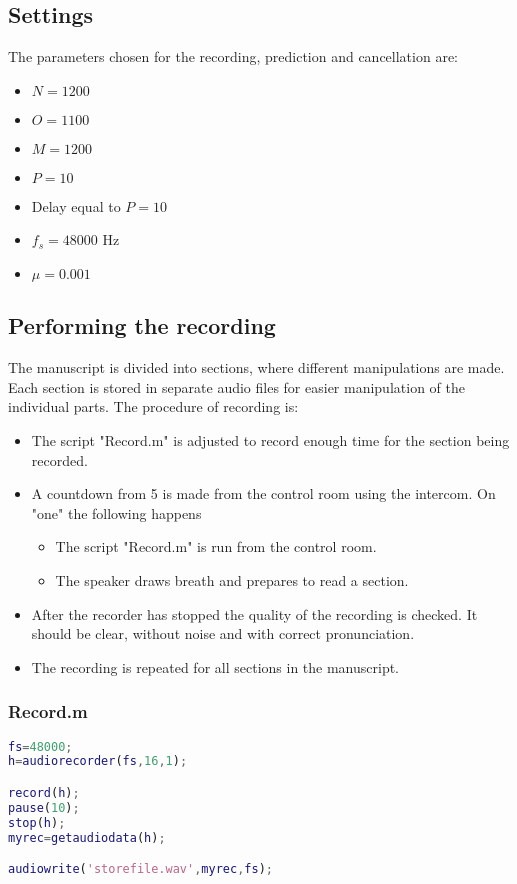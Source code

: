 \subsection{Settings}
The parameters chosen for the recording, prediction and cancellation are:
\begin{itemize}
	\item $N=1200$
	\item $O=1100$
	\item $M=1200$
	\item $P=10$
	\item Delay equal to $P=10$
	\item $f_s =48000$ Hz
	\item $\mu=0.001$
\end{itemize}

\subsection{Performing the recording}
The manuscript is divided into sections, where different manipulations are made. Each section is stored in separate audio files for easier manipulation of the individual parts. The procedure of recording is:
\begin{itemize}
	\item The script "Record.m" is adjusted to record enough time for the section being recorded. 
	\item A countdown from 5 is made from the control room using the intercom. On "one" the following happens
	\begin{itemize}
		\item The script "Record.m" is run from the control room.
		\item The speaker draws breath and prepares to read a section.
	\end{itemize}
	\item After the recorder has stopped the quality of the recording is checked. It should be clear, without noise and with correct pronunciation.
	\item The recording is repeated for all sections in the manuscript.  
\end{itemize}

\subsubsection{Record.m}
\begin{lstlisting}[language=MATLAB,caption=Record.m]
fs=48000;
h=audiorecorder(fs,16,1);

record(h);
pause(10);
stop(h);
myrec=getaudiodata(h);

audiowrite('storefile.wav',myrec,fs);
\end{lstlisting}

